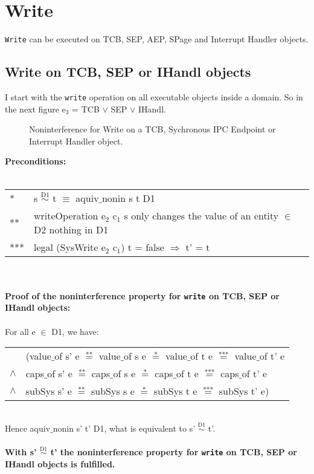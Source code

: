 \section{Write}\label{Write}
\texttt{Write} can be executed on TCB, SEP, AEP, SPage and Interrupt Handler objects.
\subsection{Write on TCB, SEP or IHandl objects}
I start with the \texttt{write} operation on all executable objects inside a domain. So in the next figure e$_3$ = TCB $\vee$ SEP $\vee$ IHandl.
\begin{figure}[H]
\caption{Noninterference for Write on a TCB, Sychronous IPC Endpoint or Interrupt Handler object.}
\end{figure}
\textbf{Preconditions:} \\ \\
\begin{tabular}{ll}
* & s $\overset{\text{D1}}{\sim}$ t $\equiv$ aquiv$\_$nonin s t D1	\\ 
** & writeOperation e$_2$ c$_1$ s only changes the value of an entity $\in$ D2 nothing in D1 \\ 
*** & legal (SysWrite e$_2$ c$_1$) t = false $\Rightarrow$ t' = t
\end{tabular} \\ \\ 
\textbf{Proof of the noninterference property for \texttt{write} on TCB, SEP or IHandl objects:}\\ \\
For all e $\in$ D1, we have: \\ 
\begin{tabular}{ll}
& (value$\_$of s' e $\overset{\text{**}}{=}$ value$\_$of s e $\overset{\text{*}}{=}$ value$\_$of t e $\overset{\text{***}}{=}$ value$\_$of t' e \\
$\wedge$ & caps$\_$of s' e $\overset{\text{**}}{=}$ caps$\_$of s e $\overset{\text{*}}{=}$ caps$\_$of t e $\overset{\text{***}}{=}$ caps$\_$of t' e \\
$\wedge$ & subSys s' e $\overset{\text{**}}{=}$ subSys s e $\overset{\text{*}}{=}$ subSys t e $\overset{\text{***}}{=}$ subSys t' e)
\end{tabular} \\
Hence aquiv$\_$nonin s' t' D1, what is equivalent to s' $\overset{\text{D1}}{\sim}$ t'. \\ \\ 
\textbf{With s' $\overset{\text{D1}}{\sim}$ t' the noninterference property for \texttt{write} on TCB, SEP or IHandl objects is fulfilled.} 
